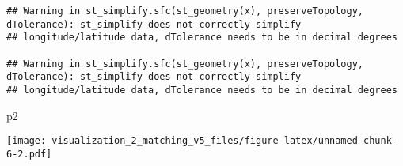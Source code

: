 \documentclass[
]{article}
\newenvironment{Shaded}{\begin{snugshade}}{\end{snugshade}}
\newcommand{\NormalTok}[1]{#1}
\begin{document}
\begin{verbatim}
## Warning in st_simplify.sfc(st_geometry(x), preserveTopology, dTolerance): st_simplify does not correctly simplify
## longitude/latitude data, dTolerance needs to be in decimal degrees

## Warning in st_simplify.sfc(st_geometry(x), preserveTopology, dTolerance): st_simplify does not correctly simplify
## longitude/latitude data, dTolerance needs to be in decimal degrees
\end{verbatim}

\begin{Shaded}
\begin{Highlighting}[]
\NormalTok{p2}
\end{Highlighting}
\end{Shaded}

\texttt{[image: visualization\_2\_matching\_v5\_files/figure-latex/unnamed-chunk-6-2.pdf]}
\end{document}
